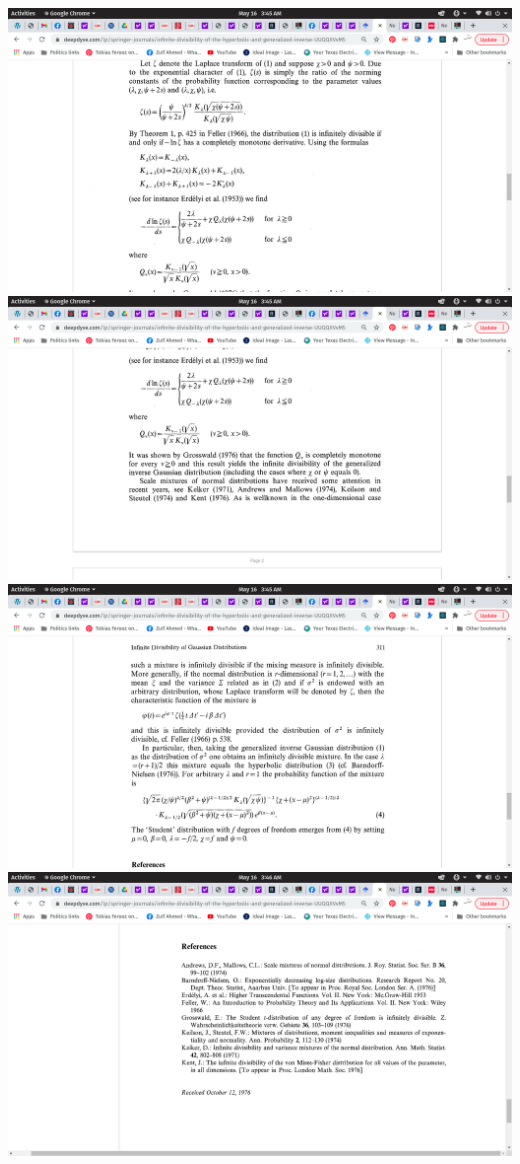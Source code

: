 \documentclass{amsart}
\begin{document}
\includegraphics[scale=0.4]{bn1976-4.png}
\includegraphics[scale=0.4]{bn1976-5.png}
\includegraphics[scale=0.4]{bn1976-6.png}
\includegraphics[scale=0.4]{bn1976-7.png}
\end{document}
